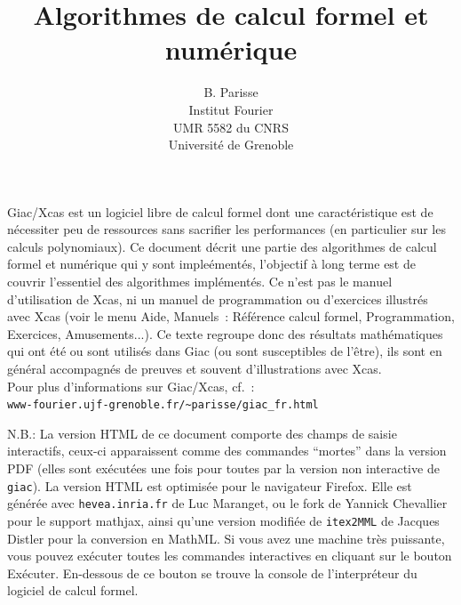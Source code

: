 \documentclass[a4paper,11pt]{book}
\title {Algorithmes de calcul formel et num\'erique}
\author{B. Parisse\\Institut Fourier\\UMR 5582 du CNRS
\\Université de Grenoble}
\date{}
\begin{document}
\begin{giacjshere} %

\maketitle

\newcommand{\product}{\prod}
\ifhevea
\newcommand{\R}{{\mathbb{R}}}
\newcommand{\C}{{\mathbb{C}}}
\newcommand{\Z}{{\mathbb{Z}}}
\newcommand{\N}{{\mathbb{N}}}
\newcommand{\Q}{{\mathbb{Q}}}
\newcommand{\tr}{\mbox{tr\,}}
\else
\newcommand{\R}{{\mathbb{R}}}
\newcommand{\C}{{\mathbb{C}}}
\newcommand{\Z}{{\mathbb{Z}}}
\newcommand{\N}{{\mathbb{N}}}
\newcommand{\Q}{{\mathbb{Q}}}
\newcommand{\tr}{\mbox{tr\,}}
\fi

Giac/Xcas est un logiciel libre de calcul formel dont
une caract\'eristique est de n\'ecessiter peu de ressources sans
sacrifier les performances (en particulier sur les calculs polynomiaux).
 Ce document d\'ecrit une partie des algorithmes de calcul formel et
 num\'erique qui y sont
imple\'ement\'es, l'objectif \`a long terme
est de couvrir l'essentiel des algorithmes impl\'ement\'es.
Ce n'est pas le manuel d'utilisation de Xcas, ni un manuel de programmation
ou d'exercices illustr\'es avec Xcas (voir le menu Aide, Manuels~:
R\'ef\'erence calcul formel, Programmation, Exercices, Amusements...).
Ce texte regroupe donc des r\'esultats
math\'ematiques qui ont \'et\'e ou sont utilis\'es dans Giac
(ou sont susceptibles de l'\^etre),
ils sont en g\'en\'eral accompagn\'es de preuves 
et souvent d'illustrations avec Xcas.\\
Pour plus d'informations sur Giac/Xcas, cf.~:\\
\verb|www-fourier.ujf-grenoble.fr/~parisse/giac_fr.html|

N.B.: La version HTML de ce document comporte des champs de saisie
interactifs, ceux-ci apparaissent comme des commandes ``mortes'' dans
la version PDF (elles sont ex\'ecut\'ees une fois pour toutes
par la version non interactive de \verb|giac|). 
La version HTML est optimis\'ee pour le navigateur Firefox. 
Elle est g\'en\'er\'ee avec \verb|hevea.inria.fr| de Luc Maranget,
ou le fork de Yannick Chevallier pour le support mathjax, ainsi
qu'une version modifi\'ee de \verb|itex2MML| 
de Jacques Distler pour la conversion en MathML.
Si vous avez une machine tr\`es puissante, vous pouvez
ex\'ecuter toutes les commandes interactives en cliquant sur le bouton
Ex\'ecuter. En-dessous de ce bouton se trouve 
la console de l'interpr\'eteur du
logiciel de calcul formel.



\end{giacjshere}
\end{document}
